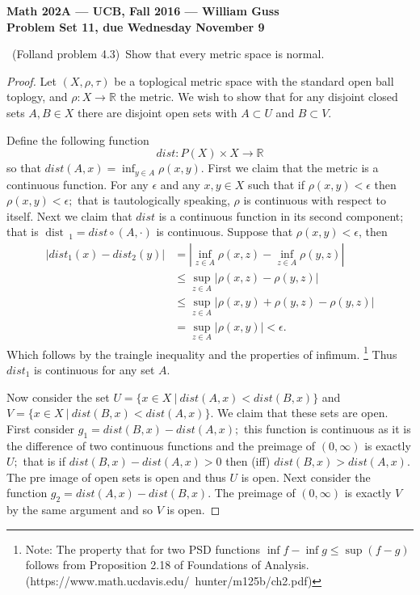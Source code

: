 \documentclass[11pt]{amsart}
\theoremstyle{definition}
\numberwithin{theorem}{section}
\numberwithin{definition}{section}
\numberwithin{equation}{section}
\def\dist{\operatorname{dist}\,}
\begin{document}
\begin{center}{\bf Math 202A --- UCB, Fall 2016 --- William Guss}
\\
{\bf Problem Set 11, due Wednesday November 9}
\end{center}


\medskip {}\ (Folland problem 4.3)\ Show that every metric space is normal.
\begin{proof}
 	Let $(X, \rho, \tau)$ be a toplogical metric space with the standard open ball toplogy, and $\rho: X \to \mathbb{R}$ the metric. We wish to show that for any disjoint closed sets $A, B \in X$ there are disjoint open sets with $A \subset U$ and $B \subset V$. 

 	Define the following function
 	\begin{equation*}
 		dist: P(X) \times X \to \mathbb{R}
 	\end{equation*}
 	so that $dist(A,x) = \inf_{y \in A} \rho(x,y).$ First we claim that the metric is a continuous function. For any $\epsilon$ and any $x,y \in X$ such that if $\rho(x,y) < \epsilon$ then $\rho(x,y) < \epsilon;$ that is tautologically speaking, $\rho$ is continuous with respect to itself. Next we claim that $dist$ is a continuous function in its second component; that is $\dist_1 =dist \circ(A, \cdot)$ is continuous. Suppose that $\rho(x,y) < \epsilon$, then
 	\begin{equation*}
 	\begin{aligned}
 	|dist_1(x) - dist_2(y)| &= \left|\inf_{z \in A} \rho(x,z) - \inf_{z \in A} \rho(y,z)\right| \\
 	&\leq \sup_{z \in A} |\rho(x,z) - \rho(y,z)|\\
 	&\leq  \sup_{z \in A} |\rho(x,y) + \rho(y,z) - \rho(y,z)|\\
 	&= \sup_{z \in A} |\rho(x,y)|  < \epsilon.
 	\end{aligned}
 	\end{equation*}
 	Which follows by the traingle inequality and the properties of infimum. \footnote{Note: The property that for two PSD functions $\inf f - \inf g \leq \sup (f -g)$ follows from Proposition 2.18 of Foundations of Analysis.  (https://www.math.ucdavis.edu/~hunter/m125b/ch2.pdf)}
 	Thus $dist_1$ is continuous for any set $A$.

 	Now consider the set $U = \{x \in X\ |\ dist(A,x)< dist(B,x)\}$ and $V =  \{x \in X\ |\ dist(B,x)< dist(A,x)\}.$ We claim that these sets are open. First consider $g_1 = dist(B,x) - dist(A, x);$ this function is continuous as it is the difference of two continuous functions and the preimage of $(0, \infty)$ is exactly $U;$ that is if $dist(B,x) - dist(A,x) > 0$ then (iff) $dist(B,x) > dist(A,x)$. The pre image of open sets is open and thus $U$ is open. Next consider the function $g_2 = dist(A,x) - dist(B,x).$ The preimage of $(0, \infty)$ is exactly $V$ by the same argument and so $V$ is open.


\end{proof}
\end{document}
